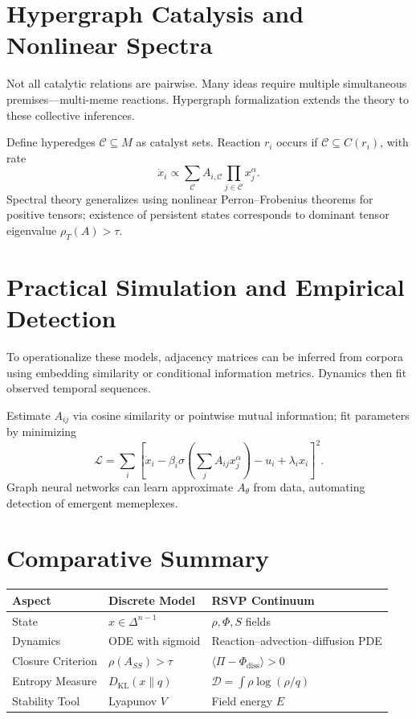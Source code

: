 \documentclass[11pt,a4paper]{article}
\newenvironment{narrative}{\begin{itshape}}{\end{itshape}}
\begin{document}
\section{Hypergraph Catalysis and Nonlinear Spectra}
\begin{narrative}
Not all catalytic relations are pairwise.  Many ideas require multiple simultaneous premises—multi-meme reactions.  Hypergraph formalization extends the theory to these collective inferences.
\end{narrative}

Define hyperedges \(\mathcal{C}\subseteq M\) as catalyst sets.  
Reaction \(r_i\) occurs if \(\mathcal{C}\subseteq C(r_i)\), with rate  
\[
\dot{x}_i \propto \sum_{\mathcal{C}}A_{i,\mathcal{C}}\prod_{j\in\mathcal{C}}x_j^\alpha.
\]
Spectral theory generalizes using nonlinear Perron–Frobenius theorems for positive tensors; existence of persistent states corresponds to dominant tensor eigenvalue \(\rho_T(A)>\tau\).  

\section{Practical Simulation and Empirical Detection}
\begin{narrative}
To operationalize these models, adjacency matrices can be inferred from corpora using embedding similarity or conditional information metrics.  Dynamics then fit observed temporal sequences.
\end{narrative}

Estimate \(A_{ij}\) via cosine similarity or pointwise mutual information; fit parameters by minimizing
\[
\mathcal L = \sum_i\!\left[\dot{x}_i - \beta_i\sigma\!\left(\sum_jA_{ij}x_j^\alpha\right)-u_i+\lambda_i x_i\right]^2.
\]
Graph neural networks can learn approximate \(A_\theta\) from data, automating detection of emergent memeplexes.

\section{Comparative Summary}
\begin{center}
\begin{tabular}{@{}lll@{}}
\toprule
Aspect & Discrete Model & RSVP Continuum \\
\midrule
State & \(x\in\Delta^{n-1}\) & \(\rho,\Phi,S\) fields \\
Dynamics & ODE with sigmoid & Reaction–advection–diffusion PDE \\
Closure Criterion & \(\rho(A_{SS})>\tau\) & \(\langle\Pi-\Phi_{\text{diss}}\rangle>0\) \\
Entropy Measure & \(D_{\mathrm{KL}}(x\|q)\) & \(\mathcal D=\int\rho\log(\rho/q)\) \\
Stability Tool & Lyapunov \(V\) & Field energy \(E\) \\
\bottomrule
\end{tabular}
\end{center}
\end{document}
